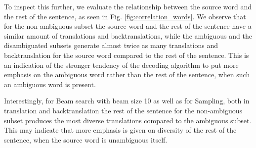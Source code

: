 To inspect this further, we evaluate the relationship between the source word and the rest of the sentence, as seen in Fig. \ref{fig:correlation_words}. We observe that for the non-ambiguous subset the source word and the rest of the sentence have a similar amount of translations and backtranslations, while the ambiguous and the disambiguated subsets generate almost twice as many translations and backtranslation for the source word compared to the rest of the sentence. This is an indication of the stronger tendency of the decoding algorithm to put more emphasis on the ambiguous word rather than the rest of the sentence, when such an ambiguous word is present. 

Interestingly, for Beam search with beam size 10 as well as for Sampling, both in translation and backtranslation the rest of the sentence for the non-ambiguous subset produces the most diverse translations compared to the ambiguous subset. This may indicate that more emphasis is given on diversity of the rest of the sentence, when the source word is unambiguous itself. 

\newpage


